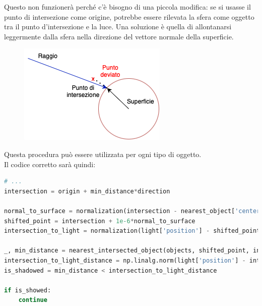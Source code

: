\documentclass[9pt,a4paper,twoside]{tau}
\begin{document}
Questo non funzionerà perché c'è bisogno di una piccola modifica: se si usasse il punto di intersezione come origine, potrebbe essere rilevata la sfera come oggetto tra il punto d'intersezione e la luce. Una soluzione è quella di allontanarsi leggermente dalla sfera nella direzione del vettore normale della superficie.
\begin{figure}[H]
    \centering
    \includegraphics[width=0.7\columnwidth]{Figures/18.png}
    \caption{}
    \label{fig:figure}
\end{figure}
Questa procedura può essere utilizzata per ogni tipo di oggetto.\\
Il codice corretto sarà quindi:
\begin{lstlisting}[language=Python]
# ...
intersection = origin + min_distance*direction

normal_to_surface = normalization(intersection - nearest_object['center'])
shifted_point = intersection + 1e-6*normal_to_surface
intersection_to_light = normalization(light['position'] - shifted_point)

_, min_distance = nearest_intersected_object(objects, shifted_point, intersection_to_light)
intersection_to_light_distance = np.linalg.norm(light['position'] - intersection)
is_shadowed = min_distance < intersection_to_light_distance
        
if is_showed:
	continue
\end{lstlisting}
\end{document}
